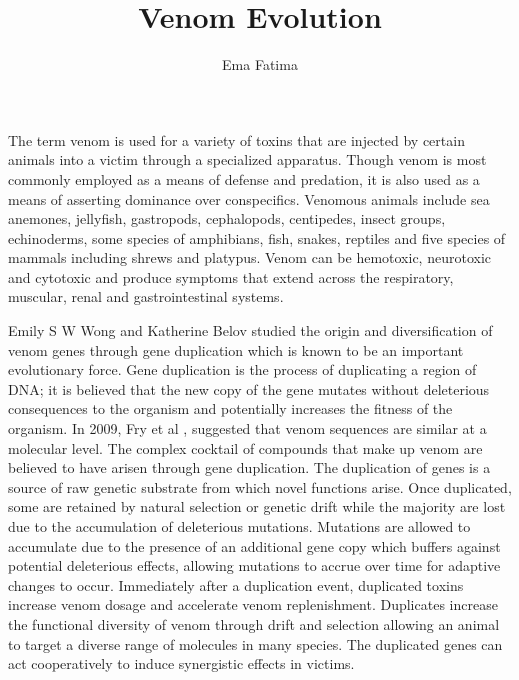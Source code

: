\documentclass{resoResearch}
\begin{document}



\begin{multicols}{2}
\title{Venom Evolution}
\author{Ema Fatima}
\maketitle






 The term venom is used for a variety of toxins
that  are  injected  by  certain  animals  into  a
victim  through  a  specialized  apparatus.
Though venom is most commonly employed
as a means of defense and predation, it is also
used as a means of asserting dominance over
conspecifics.  Venomous animals  include sea
anemones, jellyfish, gastropods, cephalopods,
centipedes, insect groups, echinoderms, some
species  of  amphibians,  fish,  snakes,  reptiles
and five species of mammals including shrews
and platypus. Venom can be hemotoxic, neurotoxic and cytotoxic and produce symptoms
that extend across the respiratory, muscular,
renal and gastrointestinal systems.

Emily S W Wong and Katherine Belov studied  the  origin  and  diversification  of  venom
genes  through  gene  duplication  which  is
known to be an important evolutionary force.
Gene duplication is the process of duplicating
a region of DNA; it is believed that the new
copy of  the gene mutates without deleterious
consequences to the organism and potentially
increases the fitness of the organism. In 2009,
Fry
et al
, suggested that venom sequences are
similar  at  a  molecular  level.  The  complex
cocktail of  compounds that  make up  venom
are believed to have arisen through gene duplication. The duplication of genes is a source
of  raw  genetic  substrate  from  which  novel
functions  arise.   Once  duplicated,  some  are
retained by natural selection or  genetic drift
while the majority are lost due to the accumulation of deleterious mutations. Mutations are
allowed to accumulate due to the presence of
an additional gene copy which buffers against
potential  deleterious  effects,  allowing  mutations to accrue over time for adaptive changes
to occur. Immediately after a duplication event,
duplicated toxins increase venom dosage and
accelerate  venom  replenishment.  Duplicates
increase  the  functional  diversity  of  venom
through  drift  and  selection  allowing an  animal to target a diverse range of molecules in
many  species.  The  duplicated genes can  act
cooperatively to induce synergistic effects in
victims.


\end{multicols}
\end{document}
